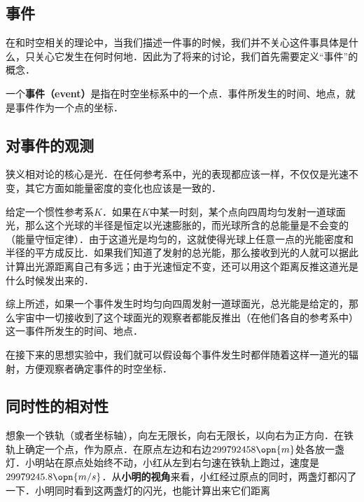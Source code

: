 

\subsection{事件}

在和时空相关的理论中，当我们描述一件事的时候，我们并不关心这件事具体是什么，只关心它发生在何时何地．因此为了将来的讨论，我们首先需要定义“事件”的概念．

一个\textbf{事件（event）}是指在时空坐标系中的一个点．事件所发生的时间、地点，就是事件作为一个点的坐标．

\subsection{对事件的观测}

狭义相对论的核心是光．在任何参考系中，光的表现都应该一样，不仅仅是光速不变，其它方面如能量密度的变化也应该是一致的．

给定一个惯性参考系$K$．如果在$K$中某一时刻，某个点向四周均匀发射一道球面光，那么这个光球的半径是恒定以光速膨胀的，而光球所含的总能量是不会变的（能量守恒定律）．由于这道光是均匀的，这就使得光球上任意一点的光能密度和半径的平方成反比．如果我们知道了发射的总光能，那么接收到光的人就可以据此计算出光源距离自己有多远；由于光速恒定不变，还可以用这个距离反推这道光是什么时候发出来的．

综上所述，如果一个事件发生时均匀向四周发射一道球面光，总光能是给定的，那么宇宙中一切接收到了这个球面光的观察者都能反推出（在他们各自的参考系中）这一事件所发生的时间、地点．

在接下来的思想实验中，我们就可以假设每个事件发生时都伴随着这样一道光的辐射，方便观察者确定事件的时空坐标．

\subsection{同时性的相对性}

想象一个铁轨（或者坐标轴），向左无限长，向右无限长，以向右为正方向．在铁轨上确定一个点，作为原点．在原点左边和右边$299792458\opn{m}$处各放一盏灯．小明站在原点处始终不动，小红从左到右匀速在铁轨上跑过，速度是$29979245.8\opn{m/s}$．从\textbf{小明的视角}来看，小红经过原点的同时，两盏灯都闪了一下．小明同时看到这两盏灯的闪光，也能计算出来它们距离

